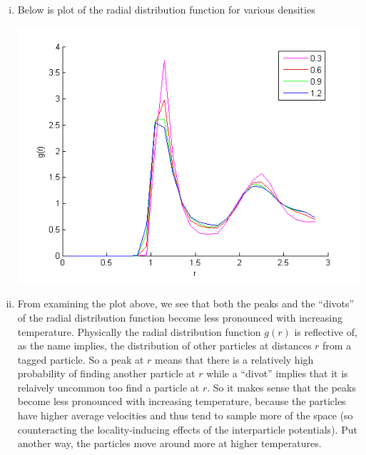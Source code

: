 \documentclass{article}
\begin{document}
\begin{enumerate}[i.]
  \item Below is plot of the radial distribution function for various densities
    \begin{center}
      \includegraphics[scale=0.7]{3iii}
    \end{center}

  \item From examining the plot above, we see that both the peaks and the ``divots'' of the radial distribution function become less pronounced with increasing temperature. Physically the radial distribution function $g(r)$ is reflective of, as the name implies, the distribution of other particles at distances $r$ from a tagged particle. So a peak at $r$ means that there is a relatively high probability of finding another particle at $r$ while a ``divot'' implies that it is relaively uncommon too find a particle at $r$. So it makes sense that the peaks become less pronounced with increasing temperature, because the particles have higher average velocities and thus tend to sample more of the space (so counteracting the locality-inducing effects of the interparticle potentials). Put another way, the particles move around more at higher temperatures.
\end{enumerate}
\end{document}
